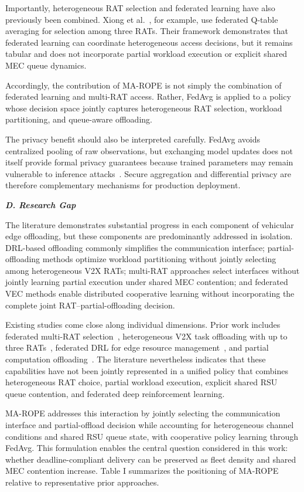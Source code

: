 Importantly, heterogeneous RAT selection and federated learning have also previously been combined. Xiong et al.~\cite{xiong2021}, for example, use federated Q-table averaging for selection among three RATs. Their framework demonstrates that federated learning can coordinate heterogeneous access decisions, but it remains tabular and does not incorporate partial workload execution or explicit shared MEC queue dynamics.

Accordingly, the contribution of MA-ROPE is not simply the combination of federated learning and multi-RAT access. Rather, FedAvg is applied to a policy whose decision space jointly captures heterogeneous RAT selection, workload partitioning, and queue-aware offloading.

The privacy benefit should also be interpreted carefully. FedAvg avoids centralized pooling of raw observations, but exchanging model updates does not itself provide formal privacy guarantees because trained parameters may remain vulnerable to inference attacks~\cite{zhu2019}. Secure aggregation and differential privacy are therefore complementary mechanisms for production deployment.

\textbf{\textit{D. Research Gap}}

The literature demonstrates substantial progress in each component of vehicular edge offloading, but these components are predominantly addressed in isolation. DRL-based offloading commonly simplifies the communication interface; partial-offloading methods optimize workload partitioning without jointly selecting among heterogeneous V2X RATs; multi-RAT approaches select interfaces without jointly learning partial execution under shared MEC contention; and federated VEC methods enable distributed cooperative learning without incorporating the complete joint RAT--partial-offloading decision.

Existing studies come close along individual dimensions. Prior work includes federated multi-RAT selection~\cite{xiong2021}, heterogeneous V2X task offloading with up to three RATs~\cite{mirza2023}, federated DRL for edge resource management~\cite{moonlim2022}, and partial computation offloading~\cite{mao2017}. The literature nevertheless indicates that these capabilities have not been jointly represented in a unified policy that combines heterogeneous RAT choice, partial workload execution, explicit shared RSU queue contention, and federated deep reinforcement learning.

MA-ROPE addresses this interaction by jointly selecting the communication interface and partial-offload decision while accounting for heterogeneous channel conditions and shared RSU queue state, with cooperative policy learning through FedAvg. This formulation enables the central question considered in this work: whether deadline-compliant delivery can be preserved as fleet density and shared MEC contention increase. Table I summarizes the positioning of MA-ROPE relative to representative prior approaches.

